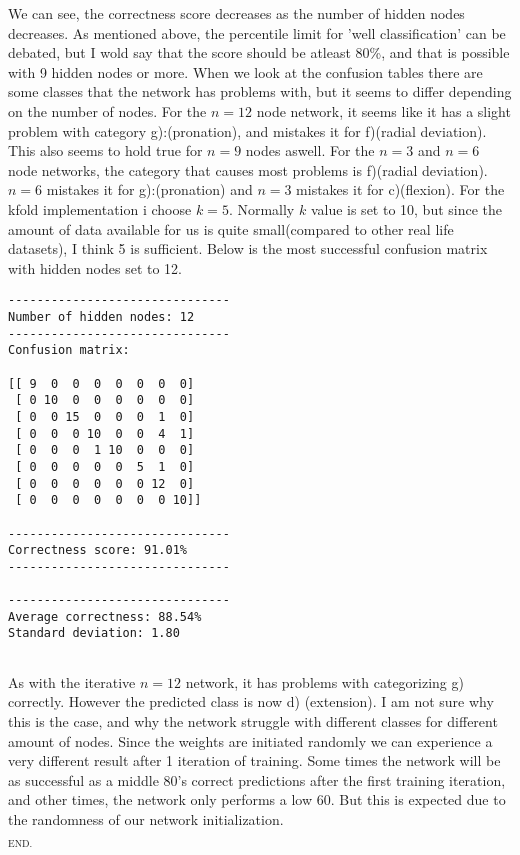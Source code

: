 \documentclass[a4paper, norsk, 12pt]{article}
\begin{document}
\noindent We can see, the correctness score decreases as the number of hidden nodes decreases. As mentioned above, the percentile limit for 'well classification' can be debated, but I wold say that the score should be atleast 80\%, and that is possible with 9 hidden nodes or more. When we look at the confusion tables there are some classes that the network has problems with, but it seems to differ depending on the number of nodes. For the $n=12$ node network, it seems like it has a slight problem with category g):(pronation), and mistakes it for  f)(radial deviation). This also seems to hold true for $n=9$ nodes aswell. For the $n=3$ and $n=6$ node networks, the category that causes most problems is f)(radial deviation). $n=6$ mistakes it for g):(pronation) and $n=3$ mistakes it for c)(flexion).
\newline\newline
\noindent For the kfold implementation i choose $k=5$. Normally $k$ value is set to 10, but since the amount of data available for us is quite small(compared to other real life datasets), I think 5 is sufficient. Below is the most successful confusion matrix with hidden nodes set to 12. 
\begin{lstlisting}
-------------------------------
Number of hidden nodes: 12
-------------------------------
Confusion matrix:

[[ 9  0  0  0  0  0  0  0]
 [ 0 10  0  0  0  0  0  0]
 [ 0  0 15  0  0  0  1  0]
 [ 0  0  0 10  0  0  4  1]
 [ 0  0  0  1 10  0  0  0]
 [ 0  0  0  0  0  5  1  0]
 [ 0  0  0  0  0  0 12  0]
 [ 0  0  0  0  0  0  0 10]]

-------------------------------
Correctness score: 91.01%
-------------------------------

-------------------------------
Average correctness: 88.54%
Standard deviation: 1.80
 
\end{lstlisting}
As with the iterative $n=12$ network, it has problems with categorizing g) correctly. However the predicted class is now d) (extension). I am not sure why this is the case, and why the network struggle with different classes for different amount of nodes. Since the weights are initiated randomly we can experience a very different result after 1 iteration of training. Some times the network will be as successful as a middle 80's correct predictions after the first training iteration, and other times, the network only performs a low 60. But this is expected due to the randomness of our network initialization. 
\newline\newline

\begin{minipage}{1\linewidth}
\begin{flushright}                            
$_\text{END.}$
\end{flushright} 
\end{minipage}
\end{document}
